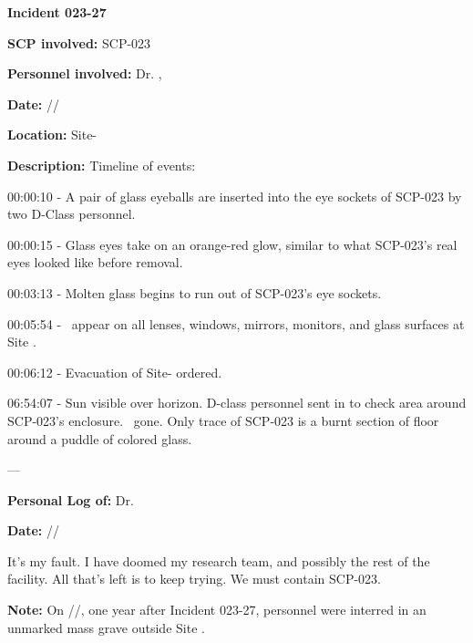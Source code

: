 \textbf{Incident 023-27}

\textbf{SCP involved:} SCP-023

\textbf{Personnel involved:} Dr. , \expunged

\textbf{Date:} //

\textbf{Location:} Site-

\textbf{Description:} Timeline of events:

00:00:10 - A pair of glass eyeballs are inserted into the eye sockets of SCP-023 by two D-Class personnel.

00:00:15 - Glass eyes take on an orange-red glow, similar to what SCP-023's real eyes looked like before removal.

00:03:13 - Molten glass begins to run out of SCP-023's eye sockets.

00:05:54 - \expunged \ appear on all lenses, windows, mirrors, monitors, and glass surfaces at Site .

00:06:12 - Evacuation of Site- ordered.

06:54:07 - Sun visible over horizon. D-class personnel sent in to check area around SCP-023's enclosure. \expunged \ gone. Only trace of SCP-023 is a burnt section of floor around a puddle of colored glass.

---

\textbf{Personal Log of:} Dr. 

\textbf{Date:} //

It's my fault. I have doomed my research team, and possibly the rest of the facility. All that's left is to keep trying. We must contain SCP-023.

\textbf{Note:} On //, one year after Incident 023-27,  personnel were interred in an unmarked mass grave outside Site .